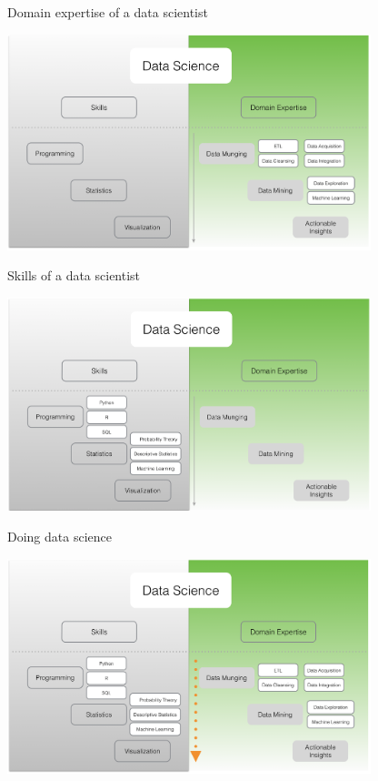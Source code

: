 \documentclass[10pt]{beamer}
\begin{document}
    \begin{frame}{Domain expertise of a data scientist}
      \begin{center}
        \includegraphics[width=300pt]{../graphs/data_science_domain}
      \end{center}
    \end{frame}

    \begin{frame}{Skills of a data scientist}
      \begin{center}
        \includegraphics[width=300pt]{../graphs/data_science_skills}
      \end{center}
    \end{frame}

    \begin{frame}{Doing data science}
      \begin{center}
        \includegraphics[width=300pt]{../graphs/data_science_skills_domain}
      \end{center}
    \end{frame}
\end{document}
